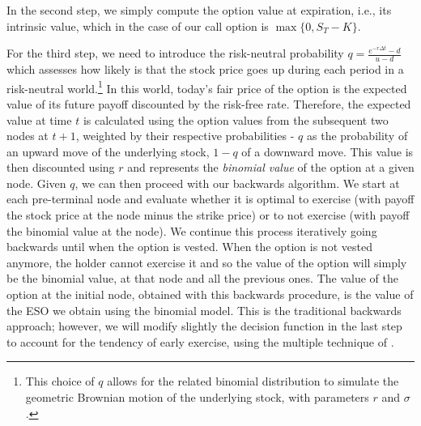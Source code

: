 In the second step, we simply compute the option value at expiration, i.e., its intrinsic value, which in the case of our call option is $\max \{0, S_T - K \}$.

For the third step, we need to introduce the risk-neutral probability $q = \frac{e^{-r \Delta t} - d}{u-d}$ which assesses how likely is that the stock price goes up during each period in a risk-neutral world.\footnote{This choice of $q$ allows for the related binomial distribution to simulate the geometric Brownian motion of the underlying stock, with parameters $r$ and $\sigma$.} In this world, today's fair price of the option is the expected value of its future payoff discounted by the risk-free rate. Therefore, the expected value at time $t$ is calculated using the option values from the subsequent two nodes at $t+1$, weighted by their respective probabilities - $q$ as the probability of an upward move of the underlying stock, $1-q$ of a downward move. This value is then discounted using $r$ and represents the \textit{binomial value} of the option at a given node. 
Given $q$, we can then proceed with our backwards algorithm. We start at each pre-terminal node and evaluate whether it is optimal to exercise (with payoff the stock price at the node minus the strike price) or to not exercise (with payoff the binomial value at the node). We continue this process iteratively going backwards until when the option is vested. When the option is not vested anymore, the holder cannot exercise it and so the value of the option will simply be the binomial value, at that node and all the previous ones.
The value of the option at the initial node, obtained with this backwards procedure, is the value of the ESO we obtain using the binomial model.
This is the traditional backwards approach; however, we will modify slightly the decision function in the last step to account for the tendency of early exercise, using the multiple technique of \cite{cox1979option}.


